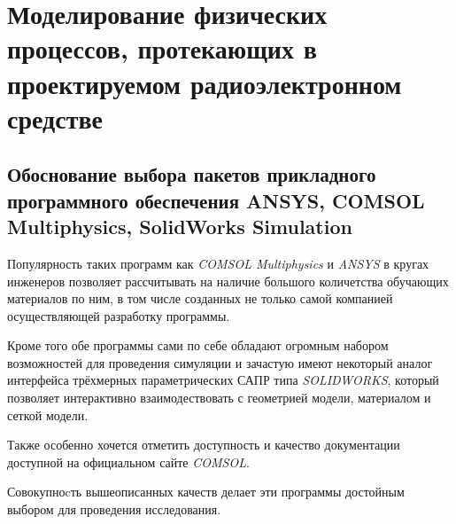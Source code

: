 \section{Моделирование 
  физических процессов,
  протекающих в проектируемом
  радиоэлектронном средстве}

  
  


\subsection{Обоснование выбора пакетов 
  прикладного программного обеспечения 
  ANSYS, COMSOL Multiphysics, SolidWorks Simulation}

Популярность таких программ как \textit{COMSOL Multiphysics} и
\textit{ANSYS} в кругах инженеров позволяет рассчитывать на наличие
большого количетства обучающих материалов по ним, в том числе
созданных не только самой компанией осуществляющей разработку
программы.

Кроме того обе программы сами по себе обладают огромным набором
возможностей для проведения симуляции и зачастую имеют некоторый
аналог интерфейса трёхмерных параметрических САПР типа
\textit{SOLIDWORKS}, который позволяет интерактивно взаимодествовать с
геометрией модели, материалом и сеткой модели.

Также особенно хочется отметить доступность и качество документации
доступной на официальном сайте \textit{COMSOL}.

Совокупноcть вышеописанных качеств делает эти программы достойным
выбором для проведения исследования.

\newpage

